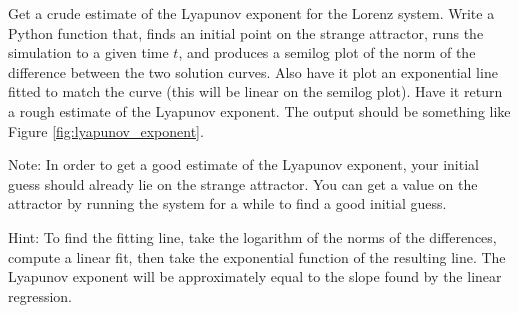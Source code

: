 \begin{problem}
Get a crude estimate of the Lyapunov exponent for the Lorenz system.
Write a Python function that, finds an initial point on the strange attractor, runs the simulation to a given time $t$, and produces a semilog plot of the norm of the difference between the two solution curves.
Also have it plot an exponential line fitted to match the curve (this will be linear on the semilog plot).
Have it return a rough estimate of the Lyapunov exponent.
The output should be something like Figure \ref{fig:lyapunov_exponent}.

Note: In order to get a good estimate of the Lyapunov exponent, your initial guess should already lie on the strange attractor.
You can get a value on the attractor by running the system for a while to find a good initial guess.

Hint: To find the fitting line, take the logarithm of the norms of the differences, compute a linear fit, then take the exponential function of the resulting line.
The Lyapunov exponent will be approximately equal to the slope found by the linear regression.
\end{problem} 